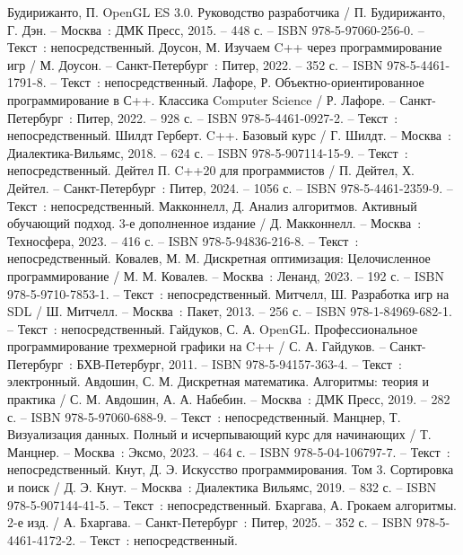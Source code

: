 
\begin{thebibliography}{9}
     Будирижанто, П. OpenGL ES 3.0. Руководство разработчика / П. Будирижанто, Г. Дэн. – Москва~: ДМК Пресс, 2015. – 448 с. – ISBN 978-5-97060-256-0. – Текст~: непосредственный.
     Доусон, М. Изучаем C++ через программирование игр / М. Доусон. – Санкт-Петербург~: Питер, 2022. – 352 с. – ISBN 978-5-4461-1791-8. – Текст~: непосредственный.
     Лафоре, Р. Объектно-ориентированное программирование в С++. Классика Computer Science / Р. Лафоре. – Санкт-Петербург~: Питер, 2022. – 928 с. – ISBN 978-5-4461-0927-2. – Текст~: непосредственный.
     Шилдт Герберт. C++. Базовый курс / Г. Шилдт. – Москва~: Диалектика-Вильямс, 2018. – 624 с. – ISBN 978-5-907114-15-9. – Текст~: непосредственный.
     Дейтел П. C++20 для программистов / П. Дейтел, Х. Дейтел. – Санкт-Петербург~: Питер, 2024. – 1056 с. – ISBN 978-5-4461-2359-9. – Текст~: непосредственный.
     Макконнелл, Д. Анализ алгоритмов. Активный обучающий подход. 3-е дополненное издание / Д. Макконнелл. – Москва~: Техносфера, 2023. – 416 с. – ISBN 978-5-94836-216-8. – Текст~: непосредственный.
     Ковалев, М. М. Дискретная оптимизация: Целочисленное программирование / М. М. Ковалев. – Москва~: Ленанд, 2023. – 192 с. – ISBN 978-5-9710-7853-1. – Текст~: непосредственный.
     Митчелл, Ш. Разработка игр на SDL / Ш. Митчелл. – Москва~: Пакет, 2013. – 256 с. – ISBN 978-1-84969-682-1. – Текст~: непосредственный.
     Гайдуков, С. А. OpenGL. Профессиональное программирование трехмерной графики на C++ / С. А. Гайдуков. – Санкт-Петербург~: БХВ-Петербург, 2011. – ISBN 978-5-94157-363-4. – Текст~: электронный.
     Авдошин, С. М. Дискретная математика. Алгоритмы: теория и практика / С. М. Авдошин, А. А. Набебин. – Москва~: ДМК Пресс, 2019. – 282 с. – ISBN 978-5-97060-688-9. – Текст~: непосредственный.
     Манцнер, Т. Визуализация данных. Полный и исчерпывающий курс для начинающих / Т. Манцнер. – Москва~: Эксмо, 2023. – 464 с. – ISBN 978-5-04-106797-7. – Текст~: непосредственный.
     Кнут, Д. Э. Искусство программирования. Том 3. Сортировка и поиск / Д. Э. Кнут. – Москва~: Диалектика Вильямс, 2019. – 832 с. – ISBN 978-5-907144-41-5. – Текст~: непосредственный.
     Бхаргава, А. Грокаем алгоритмы. 2-е изд. / А. Бхаргава. – Санкт-Петербург~: Питер, 2025. – 352 с. – ISBN 978-5-4461-4172-2. – Текст~: непосредственный.

\end{thebibliography}
